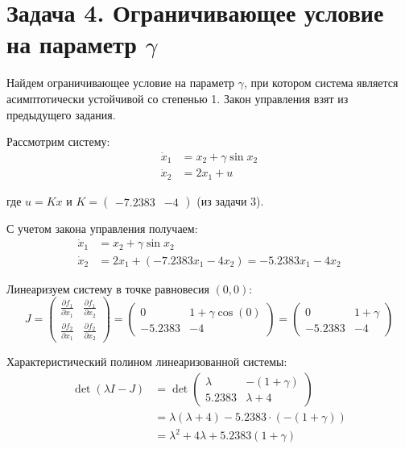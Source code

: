 \section{Задача 4. Ограничивающее условие на параметр $\gamma$}

Найдем ограничивающее условие на параметр $\gamma$, при котором система является асимптотически устойчивой со степенью 1. Закон управления взят из предыдущего задания.

Рассмотрим систему:
\begin{align*}
\dot{x}_1 &= x_2 + \gamma \sin x_2 \\
\dot{x}_2 &= 2x_1 + u
\end{align*}

где $u = Kx$ и $K = \begin{pmatrix} -7.2383 & -4 \end{pmatrix}$ (из задачи 3).

С учетом закона управления получаем:
\begin{align*}
\dot{x}_1 &= x_2 + \gamma \sin x_2 \\
\dot{x}_2 &= 2x_1 + (-7.2383x_1 - 4x_2) = -5.2383x_1 - 4x_2
\end{align*}

Линеаризуем систему в точке равновесия $(0,0)$:
\begin{equation*}
J = \begin{pmatrix} 
\frac{\partial f_1}{\partial x_1} & \frac{\partial f_1}{\partial x_2} \\
\frac{\partial f_2}{\partial x_1} & \frac{\partial f_2}{\partial x_2}
\end{pmatrix} = \begin{pmatrix} 
0 & 1 + \gamma \cos(0) \\
-5.2383 & -4
\end{pmatrix} = \begin{pmatrix} 
0 & 1 + \gamma \\
-5.2383 & -4
\end{pmatrix}
\end{equation*}

Характеристический полином линеаризованной системы:
\begin{align*}
\det(\lambda I - J) &= \det\begin{pmatrix} \lambda & -(1+\gamma) \\ 5.2383 & \lambda+4 \end{pmatrix} \\
&= \lambda(\lambda+4) - 5.2383 \cdot (-(1+\gamma)) \\
&= \lambda^2 + 4\lambda + 5.2383(1+\gamma)
\end{align*}

